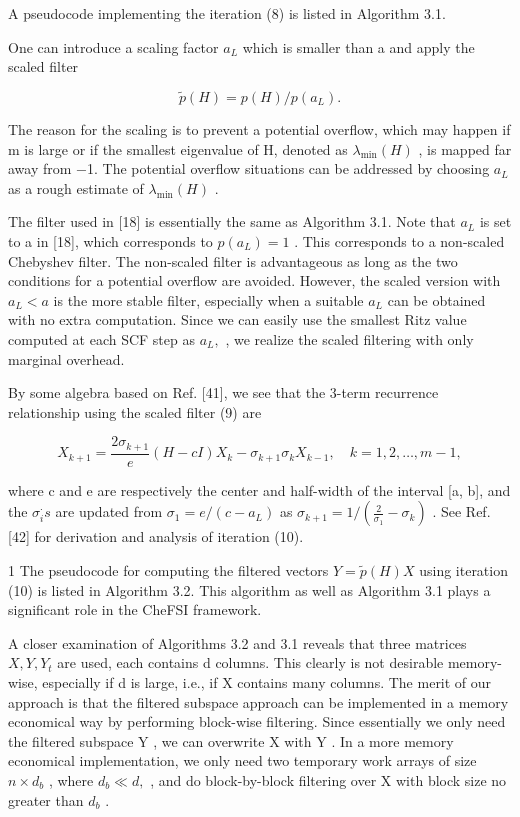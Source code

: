 \documentclass[
  10
]{article}
\begin{document}
A pseudocode implementing the iteration (8) is listed in Algorithm 3.1.

One can introduce a scaling factor \(a _ { L }\) which is smaller than a
and apply the scaled filter

\[
\tilde {p} (H) = p (H) / p (a _ {L}). \tag {9}
\]

The reason for the scaling is to prevent a potential overflow, which may
happen if m is large or if the smallest eigenvalue of H, denoted as
\(\lambda _ { \operatorname* { m i n } } ( H )\) , is mapped far away
from −1. The potential overflow situations can be addressed by choosing
\(a _ { L }\) as a rough estimate of
\(\lambda _ { \operatorname* { m i n } } ( H )\) .

The filter used in {[}18{]} is essentially the same as Algorithm 3.1.
Note that \(a _ { L }\) is set to a in {[}18{]}, which corresponds to
\(p ( a _ { L } ) = 1\) . This corresponds to a non-scaled Chebyshev
filter. The non-scaled filter is advantageous as long as the two
conditions for a potential overflow are avoided. However, the scaled
version with \(a _ { L } < a\) is the more stable filter, especially
when a suitable \(a _ { L }\) can be obtained with no extra computation.
Since we can easily use the smallest Ritz value computed at each SCF
step as \(a _ { L } ,\) , we realize the scaled filtering with only
marginal overhead.

By some algebra based on Ref. {[}41{]}, we see that the 3-term
recurrence relationship using the scaled filter (9) are

\[
X _ {k + 1} = \frac {2 \sigma_ {k + 1}}{e} (H - c I) X _ {k} - \sigma_ {k + 1} \sigma_ {k} X _ {k - 1}, \quad k = 1, 2, \dots , m - 1, \tag {10}
\]

where c and e are respectively the center and half-width of the interval
{[}a, b{]}, and the \(\sigma _ { i } ^ { \cdot } s\) are updated from
\(\sigma _ { 1 } = e / ( c - a _ { L } )\) as
\(\sigma _ { k + 1 } = 1 / ( \frac { 2 } { \sigma _ { 1 } } - \sigma _ { k } )\)
. See Ref. {[}42{]} for derivation and analysis of iteration (10).

1 The pseudocode for computing the filtered vectors
\(Y = \tilde { p } ( H ) X\) using iteration (10) is listed in Algorithm
3.2. This algorithm as well as Algorithm 3.1 plays a significant role in
the CheFSI framework.

A closer examination of Algorithms 3.2 and 3.1 reveals that three
matrices \(X , Y , Y _ { t }\) are used, each contains d columns. This
clearly is not desirable memory-wise, especially if d is large, i.e., if
X contains many columns. The merit of our approach is that the filtered
subspace approach can be implemented in a memory economical way by
performing block-wise filtering. Since essentially we only need the
filtered subspace Y , we can overwrite X with Y . In a more memory
economical implementation, we only need two temporary work arrays of
size \(n \times d _ { b }\) , where \(d _ { b } \ll d ,\) , and do
block-by-block filtering over X with block size no greater than
\(d _ { b }\) .
\end{document}
